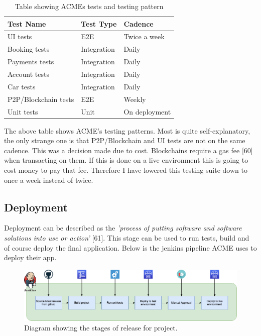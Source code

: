   \begin{table}[H]
    \centering
    \begin{tabular}{|l|l|l|}
      \hline
      \textbf{Test Name}    & \textbf{Test Type}  & \textbf{Cadence}  \\ \hline
      UI tests              & E2E                 & Twice a week      \\ \hline
      Booking tests         & Integration         & Daily             \\ \hline
      Payments tests        & Integration         & Daily             \\ \hline     
      Account tests         & Integration         & Daily             \\ \hline     
      Car tests             & Integration         & Daily             \\ \hline   
      P2P/Blockchain tests  & E2E                 & Weekly            \\ \hline 
      Unit tests            & Unit                & On deployment     \\ \hline    
    \end{tabular}
    \caption{Table showing ACMEs tests and testing pattern}
  \end{table}

  The above table shows ACME's testing patterns. Most is quite self-explanatory, the only strange one is that P2P/Blockchain and UI tests are not on 
  the same cadence. This was a decision made due to cost. Blockchains require a gas fee [60] when transacting on them. If this is done on a live 
  environment this is going to cost money to pay that fee. Therefore I have lowered this testing suite down to once a week instead of twice.

  \subsection{Deployment}
  \label{sec:Deployment}

  Deployment can be described as the \textit{'process of putting software and software solutions into use or action'} [61]. This stage can be
  used to run tests, build and of course deploy the final application. Below is the jenkins pipeline ACME uses to deploy their app.

  \begin{figure}[H]
    \centering
    \includegraphics[width=12cm]{assets/relasePipeline.drawio.png}
    \caption{Diagram showing the stages of release for project.}
    \label{fig:releasePipeline}
  \end{figure}

